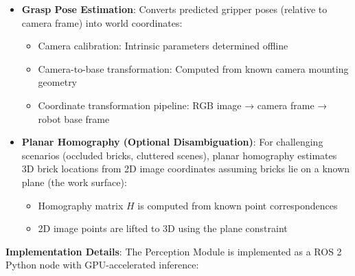 \begin{itemize}
    The output is a ranked list of candidate grasps with confidence scores, allowing the Planning Module to select collision-free grasps.
    
    \item \textbf{Grasp Pose Estimation}: Converts predicted gripper poses (relative to camera frame) into world coordinates:
    \begin{itemize}
        \item Camera calibration: Intrinsic parameters determined offline
        \item Camera-to-base transformation: Computed from known camera mounting geometry
        \item Coordinate transformation pipeline: RGB image → camera frame → robot base frame
    \end{itemize}
    
    \item \textbf{Planar Homography (Optional Disambiguation)}: For challenging scenarios (occluded bricks, cluttered scenes), planar homography estimates 3D brick locations from 2D image coordinates assuming bricks lie on a known plane (the work surface):
    \begin{itemize}
        \item Homography matrix $H$ is computed from known point correspondences
        \item 2D image points are lifted to 3D using the plane constraint
    \end{itemize}
\end{itemize}

\textbf{Implementation Details}:
The Perception Module is implemented as a ROS 2 Python node with GPU-accelerated inference:


